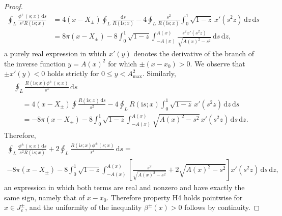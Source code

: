 \documentclass[12pt]{amsart}
\numberwithin{equation}{section}
\newcommand{\dd}{\mathrm{d}}
\newcommand{\ii}{\mathrm{i}}
\begin{document}
\begin{proof}
\begin{equation}
\begin{split}
\oint_L\frac{\phi^\pm(s;x)\,\dd s}{s^2R(\ii s;x)}&= 4(x-X_\pm)\oint_L\frac{\dd s}{R(\ii s;x)} -4\oint_L \frac{s^2}{R(\ii s;x)} \int_0^1\sqrt{1-z}\,x'(s^2z)\,\dd z\,\dd s\\
&= 8\pi (x-X_\pm) -8\int_0^1\sqrt{1-z}\int_{-A(x)}^{A(x)}\frac{s^2x'(s^2z)}{\sqrt{A(x)^2-s^2}}\,\dd s\,\dd z,
\end{split}
\end{equation}
a purely real expression in which $x'(y)$ denotes the derivative of the branch of the inverse function $y=A(x)^2$ for which $\pm(x-x_0)>0$.  We observe that $\pm x'(y)<0$ holds strictly for $0\le y<A_\mathrm{max}^2$.  Similarly,
\begin{multline}
\oint_L\frac{R(\ii s;x)\phi^\pm(s;x)}{s^4}\,\dd s \\
\begin{aligned}
&= 4(x-X_\pm)\oint\frac{R(\ii s;x)\,\dd s}{s^2} -4\oint_L R(\ii s;x)\int_0^1\sqrt{1-z}\,x'(s^2z)\,\dd z\,\dd s\\
&=-8\pi (x-X_\pm)-8\int_0^1\sqrt{1-z}\int_{-A(x)}^{A(x)}\sqrt{A(x)^2-s^2}\,x'(s^2z)\,\dd s\,\dd z.
\end{aligned}
\end{multline}
Therefore,
\begin{multline}
\oint_L\frac{\phi^\pm(s;x)\,\dd s}{s^2R(\ii s;x)}+2\oint_L\frac{R(\ii s;x)\phi^\pm(s;x)}{s^4}\,\dd s = \\
-8\pi(x-X_\pm)-8\int_0^1\sqrt{1-z}\int_{-A(x)}^{A(x)}\left[\frac{s^2}{\sqrt{A(x)^2-s^2}}+2\sqrt{A(x)^2-s^2}\right]x'(s^2z)\,\dd s\,\dd z,
\end{multline}
an expression in which both terms are real and nonzero and have exactly the same sign, namely that of $x-x_0$.  Therefore property H4 holds pointwise for $x\in J_c^\pm$, and the uniformity of the inequality $\beta^\pm(x)>0$ follows by continuity.  


\end{proof}
\end{document}
